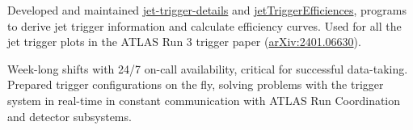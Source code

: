 
\begin{cventries}
    {Developed and maintained \href{https://gitlab.cern.ch/atlas-trigger/jet/jet-trigger-details}{jet-trigger-details} and \href{https://gitlab.cern.ch/atlas-trigger/jet/jetTriggerEfficiencies/-/tree/R22-master}{jetTriggerEfficiences}, programs to derive jet trigger information and calculate efficiency curves. Used for all the jet trigger plots in the ATLAS Run 3 trigger paper (\href{https://doi.org/10.48550/arXiv.2401.06630}{arXiv:2401.06630}).}

    {Week-long shifts with 24/7 on-call availability, critical for successful data-taking. Prepared trigger configurations on the fly, solving problems with the trigger system in real-time in constant communication with ATLAS Run Coordination and detector subsystems.}


\end{cventries}
